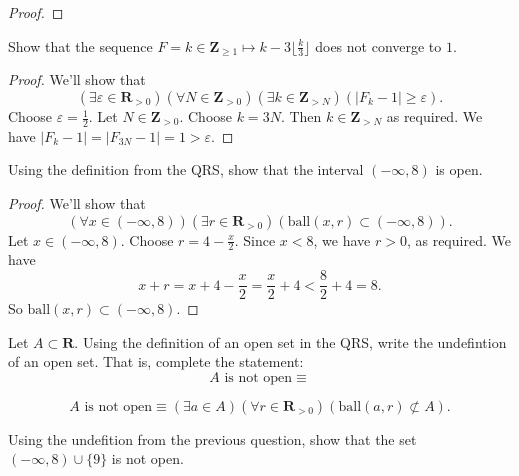 \documentclass[12pt, fleqn]{exam}
\newcommand{\reals}{\mathbf{R}}
\newcommand{\integers}{\mathbf{Z}}
\newcommand{\ball}{\mathrm{ball}}
\begin{document}
\begin{questions}
\begin{solution}
\begin{proof}
\end{proof}
\end{solution}
\question Show that the sequence $F = k \in \integers_{\geq 1} \mapsto k - 3 \lfloor \frac{k}{3} \rfloor $ does 
not converge to $1$.

\begin{solution}
\begin{proof}  We'll show that
\begin{equation*}
  \left(\exists \varepsilon \in \reals_{> 0} \right)
  \left(\forall  N \in \integers_{> 0} \right)
   \left(\exists  k \in \integers_{> N} \right)
   \left(  | F_k - 1 | \geq \varepsilon \right).
\end{equation*}
Choose $\varepsilon = \frac{1}{2}$. Let $N \in \integers_{>0}$. Choose $k = 3 N$. Then $k  \in \integers_{> N}$
as required. We have $|F_k - 1| = |F_{3 N} -1 | = 1 > \varepsilon$.
\end{proof}
\end{solution}

\question Using the definition from the QRS, show that the interval $(-\infty, 8)$ is open.

\begin{solution}
\begin{proof} We'll show that 
\begin{equation*}
   \left(\forall x \in (-\infty, 8)\right) \left(\exists r \in \reals_{>0}\right)(\ball(x,r)  \subset (-\infty, 8)).
\end{equation*}
Let $x \in   (-\infty, 8)$. Choose $r = 4 - \frac{x}{2}$. Since $x < 8$, we have $r > 0$, as required.  
We have 
\begin{equation*}
x + r = x + 4  - \frac{x}{2} = \frac{x}{2} + 4 < \frac{8}{2} + 4 = 8.
\end{equation*}
So $\ball(x,r)  \subset (-\infty, 8)$.
\end{proof}
\end{solution}

\question Let $A \subset \reals$.  Using the definition of an open set in the QRS, write
the undefintion of an open set. That is, complete the statement:
\begin{equation*}
  A \text{ is not open} \equiv 
\end{equation*}

\begin{solution}
\begin{equation*}
  A \text{ is not open} \equiv \left(\exists a \in A\right) \left(\forall r \in \reals_{>0}\right) \left(\ball(a,r) \not \subset A \right).
 \end{equation*}
\end{solution}
\question Using the undefition from the previous question, show that the set \mbox{$(-\infty, 8) \cup \{9 \}$} is
not open.


\end{questions}
\end{document}
